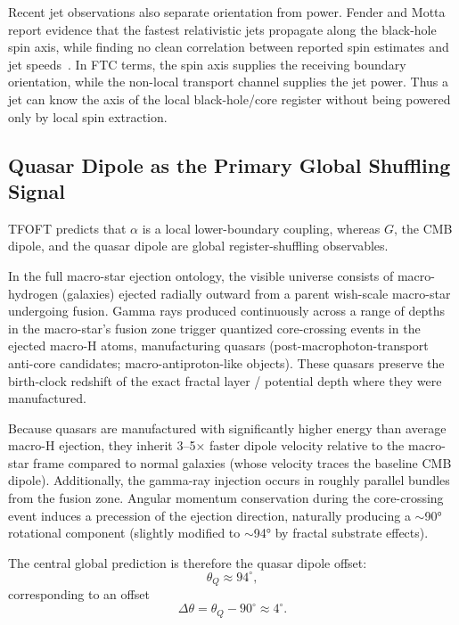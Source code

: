 \documentclass[11pt,a4paper]{article}
\begin{document}
Recent jet observations also separate orientation from power. Fender and Motta report evidence that the fastest relativistic jets propagate along the black-hole spin axis, while finding no clean correlation between reported spin estimates and jet speeds~\cite{FenderMotta2025}. In FTC terms, the spin axis supplies the receiving boundary orientation, while the non-local transport channel supplies the jet power. Thus a jet can know the axis of the local black-hole/core register without being powered only by local spin extraction.


\subsection{Quasar Dipole as the Primary Global Shuffling Signal}

TFOFT predicts that \(\alpha\) is a local lower-boundary coupling, whereas \(G\), the CMB dipole, and the quasar dipole are global register-shuffling observables.

In the full macro-star ejection ontology, the visible universe consists of macro-hydrogen (galaxies) ejected radially outward from a parent wish-scale macro-star undergoing fusion. Gamma rays produced continuously across a range of depths in the macro-star’s fusion zone trigger quantized core-crossing events in the ejected macro-H atoms, manufacturing quasars (post-macrophoton-transport anti-core candidates; macro-antiproton-like objects). These quasars preserve the birth-clock redshift of the exact fractal layer / potential depth where they were manufactured.

Because quasars are manufactured with significantly higher energy than average macro-H ejection, they inherit 3--5× faster dipole velocity relative to the macro-star frame compared to normal galaxies (whose velocity traces the baseline CMB dipole). Additionally, the gamma-ray injection occurs in roughly parallel bundles from the fusion zone. Angular momentum conservation during the core-crossing event induces a precession of the ejection direction, naturally producing a $\sim$90° rotational component (slightly modified to $\sim$94° by fractal substrate effects).

The central global prediction is therefore the quasar dipole offset:
\begin{equation}
\theta_Q\approx94^\circ,
\end{equation}
corresponding to an offset
\begin{equation}
\Delta\theta = \theta_Q-90^\circ \approx4^\circ.
\end{equation}
\end{document}
